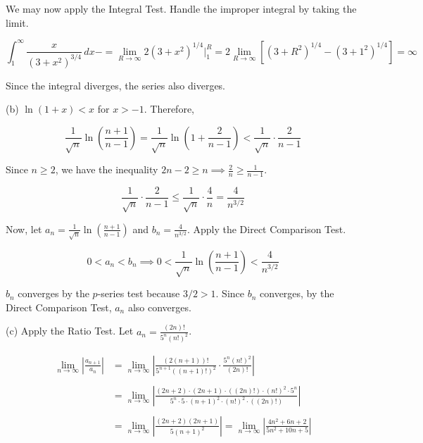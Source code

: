 \documentclass{article}
\begin{document}
\hfill

\noindent We may now apply the Integral Test. Handle the improper integral by taking the limit.

\[\int_1^\infty\frac x{\left(3+x^2\right)^{3/4}}\,dx-=\lim_{R\to\infty}2\left(3+x^2\right)^{1/4}\bigg|_1^R=2\lim_{R\to\infty}\left[(3+R^2)^{1/4}-\left(3+1^2\right)^{1/4}\right]=\infty\]

\hfill

\noindent Since the integral diverges, the series also diverges.

\hfill

\noindent (b) $\ln(1+x)<x$ for $x>-1$. Therefore,

\[\frac1{\sqrt n}\ln\left(\frac{n+1}{n-1}\right)=\frac1{\sqrt n}\ln\left(1+\frac2{n-1}\right)<\frac1{\sqrt n}\cdot\frac2{n-1}\]

\hfill

\noindent Since $n\geq2$, we have the inequality $\displaystyle 2n-2\geq n\implies\frac2n\geq\frac1{n-1}$.

\hfill

\[\frac1{\sqrt n}\cdot\frac2{n-1}\leq\frac1{\sqrt n}\cdot\frac4n=\frac4{n^{3/2}}\]

\hfill

\noindent Now, let $\displaystyle a_n=\frac1{\sqrt n}\ln\left(\frac{n+1}{n-1}\right)$ and $\displaystyle b_n=\frac4{n^{3/2}}$. Apply the Direct Comparison Test.

\[0<a_n<b_n\implies0<\frac1{\sqrt n}\ln\left(\frac{n+1}{n-1}\right)<\frac4{n^{3/2}}\]

\hfill

\noindent $b_n$ converges by the $p$-series test because $3/2>1$. Since $b_n$ converges, by the Direct Comparison Test, $a_n$ also converges.

\noindent (c) Apply the Ratio Test. Let $\displaystyle a_n=\frac{(2n)!}{5^n\left(n!\right)^2}$.

\begin{align*}\lim_{n\to\infty}\left|\frac{a_{n+1}}{a_n}\right|&=\lim_{n\to\infty}\left|\frac{(2(n+1))!}{5^{n+1}\left((n+1)!\right)^2}\cdot\frac{5^n\left(n!\right)^2}{(2n)!}\right|\\\\&=\lim_{n\to\infty}\left|\frac{(2n+2)\cdot(2n+1)\cdot((2n)!)\cdot(n!)^2\cdot5^n}{5^n\cdot5\cdot(n+1)^2\cdot(n!)^2\cdot((2n)!)}\right|\\\\&=\lim_{n\to\infty}\left|\frac{(2n+2)(2n+1)}{5(n+1)^2}\right|=\lim_{n\to\infty}\left|\frac{4n^2+6n+2}{5n^2+10n+5}\right|\end{align*}
\end{document}
